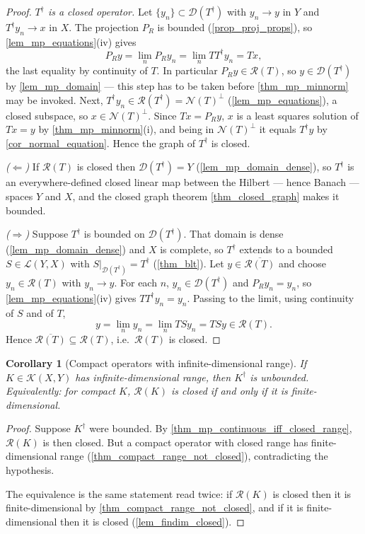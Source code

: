 \documentclass[a4paper]{report}
\theoremstyle{plain}
\newtheorem{corollary}[theorem]{Corollary}
\theoremstyle{definition}
\theoremstyle{remark}
\newcommand{\Ll}{\mathcal{L}}
\newcommand{\Kk}{\mathcal{K}}
\newcommand{\Ran}{\mathcal{R}}
\newcommand{\Ker}{\mathcal{N}}
\newcommand{\Dom}{\mathcal{D}}
\newcommand{\dg}{^{\dagger}}
\begin{document}
\begin{proof}
  \emph{$T\dg$ is a closed operator.}  Let $\{y_n\} \subset \Dom(T\dg)$ with $y_n \to y$
  in $Y$ and $T\dg y_n \to x$ in $X$.  The projection $P_R$ is bounded
  (\cref{prop_proj_props}), so \cref{lem_mp_equations}(iv) gives
  \[
    P_Ry = \lim_{n} P_Ry_n = \lim_n TT\dg y_n = Tx,
  \]
  the last equality by continuity of $T$.  In particular $P_Ry \in \Ran(T)$, so
  $y \in \Dom(T\dg)$ by \cref{lem_mp_domain} --- this step has to be taken before
  \cref{thm_mp_minnorm} may be invoked.  Next, $T\dg y_n \in \Ran(T\dg) =
  \Ker(T)^{\perp}$ (\cref{lem_mp_equations}), a closed subspace, so $x \in
  \Ker(T)^{\perp}$.  Since $Tx = P_Ry$, $x$ is a least squares solution of $Tx = y$ by
  \cref{thm_mp_minnorm}(i), and being in $\Ker(T)^{\perp}$ it equals $T\dg y$ by
  \cref{cor_normal_equation}.  Hence the graph of $T\dg$ is closed.

  \emph{($\Leftarrow$)}  If $\Ran(T)$ is closed then $\Dom(T\dg) = Y$
  (\cref{lem_mp_domain_dense}), so $T\dg$ is an everywhere-defined closed linear map
  between the Hilbert --- hence Banach --- spaces $Y$ and $X$, and the closed graph theorem
  \cref{thm_closed_graph} makes it bounded.

  \emph{($\Rightarrow$)}  Suppose $T\dg$ is bounded on $\Dom(T\dg)$.  That domain is dense
  (\cref{lem_mp_domain_dense}) and $X$ is complete, so $T\dg$ extends to a bounded
  $S \in \Ll(Y,X)$ with $S|_{\Dom(T\dg)} = T\dg$ (\cref{thm_blt}).  Let
  $y \in \overline{\Ran(T)}$ and choose $y_n \in \Ran(T)$ with $y_n \to y$.  For each $n$,
  $y_n \in \Dom(T\dg)$ and $P_Ry_n = y_n$, so \cref{lem_mp_equations}(iv) gives
  $TT\dg y_n = y_n$.  Passing to the limit, using continuity of $S$ and of $T$,
  \[
    y = \lim_n y_n = \lim_n T S y_n = T S y \in \Ran(T).
  \]
  Hence $\overline{\Ran(T)} \subseteq \Ran(T)$, i.e.\ $\Ran(T)$ is closed.
\end{proof}


\begin{corollary}[Compact operators with infinite-dimensional range]
  \label{cor_mp_compact_discontinuous}
  If $K \in \Kk(X,Y)$ has infinite-dimensional range, then $K\dg$ is unbounded.
  Equivalently: for compact $K$, $\Ran(K)$ is closed if and only if it is
  finite-dimensional.
\end{corollary}

\begin{proof}
  Suppose $K\dg$ were bounded.  By \cref{thm_mp_continuous_iff_closed_range}, $\Ran(K)$ is
  then closed.  But a compact operator with closed range has finite-dimensional range
  (\cref{thm_compact_range_not_closed}), contradicting the hypothesis.

  The equivalence is the same statement read twice: if $\Ran(K)$ is closed then it is
  finite-dimensional by \cref{thm_compact_range_not_closed}, and if it is finite-dimensional
  then it is closed (\cref{lem_findim_closed}).
\end{proof}
\end{document}
